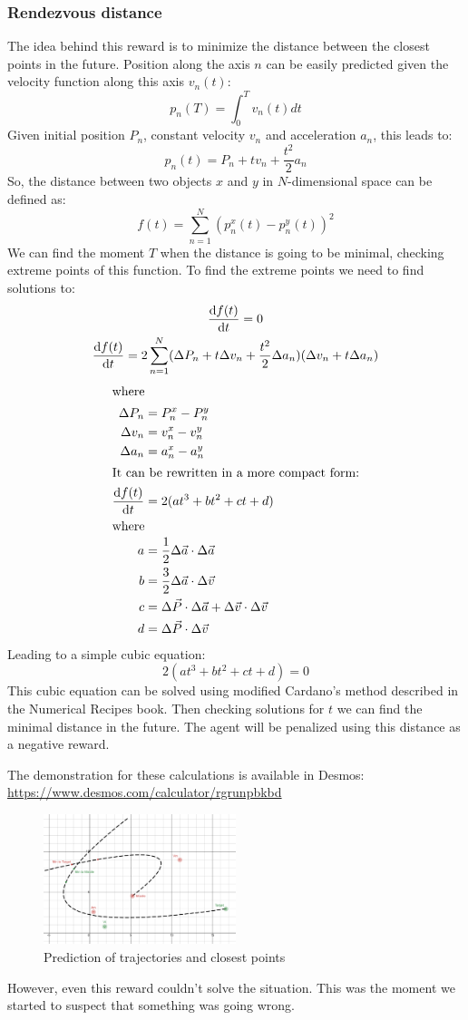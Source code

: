 \subsubsection{Rendezvous distance}
The idea behind this reward is to minimize the distance between the closest points in the future.
Position along the axis $n$ can be easily predicted given the velocity function along this axis $v_n(t)$:
\[
	p_n(T) = \int_{0}^{T}v_n(t)dt
\]
Given initial position $P_n$, constant velocity $v_n$ and acceleration $a_n$, this leads to:
\[
	p_n(t) = P_n + t v_n + \frac{t^2}{2} a_n
\]
So, the distance between two objects $x$ and $y$ in $N$-dimensional space can be defined as:
\[
	f(t) = \sum_{n=1}^{N} \left(p_n^x(t) - p_n^y(t)\right)^2
\]
We can find the moment $T$ when the distance is going to be minimal, checking extreme points of this function.
To find the extreme points we need to find solutions to:
\begin{gather*}
	\odv{f(t)}{t} = 0 \\
	\odv{f(t)}{t} = 2 \sum_{n=1}^{N}(\Delta P_n + t \Delta v_n + \frac{t^2}{2} \Delta a_n)(\Delta v_n + t \Delta a_n)
\end{gather*}
\begin{align*}
	\intertext{where}
	\Delta P_n &= P_n^x - P_n^y \\
	\Delta v_n &= v_n^x - v_n^y \\
	\Delta a_n &= a_n^x - a_n^y \\
	\intertext{It can be rewritten in a more compact form:}
	\odv{f(t)}{t} &= 2(at^3 + bt^2 + ct + d) \\
	\intertext{where}
	a &= \frac{1}{2} \Delta \vec{a} \cdot \Delta \vec{a} \\
	b &= \frac{3}{2} \Delta \vec{a} \cdot \Delta \vec{v} \\
	c &= \Delta \vec{P} \cdot \Delta \vec{a} + \Delta \vec{v} \cdot \Delta \vec{v} \\
	d &= \Delta \vec{P} \cdot \Delta \vec{v}
\end{align*}
Leading to a simple cubic equation:
\[
	2(at^3 + bt^2 + ct + d) = 0
\]
This cubic equation can be solved using modified Cardano's method described in the Numerical Recipes book.
Then checking solutions for $t$ we can find the minimal distance in the future.
The agent will be penalized using this distance as a negative reward.

The demonstration for these calculations is available in Desmos: \url{https://www.desmos.com/calculator/rgrunpbkbd}
\begin{figure}[H]
	\centering
	\includegraphics[width=0.5\textwidth]{images/rendezvous.png}
	\caption{Prediction of trajectories and closest points}
	\label{fig:rendezvous}
\end{figure}

However, even this reward couldn't solve the situation.
This was the moment we started to suspect that something was going wrong.